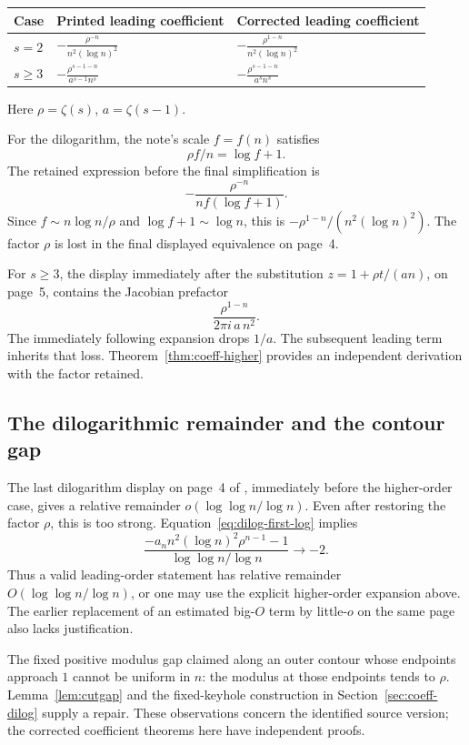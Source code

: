 \documentclass[11pt,a4paper]{article}
\numberwithin{equation}{section}
\theoremstyle{definition}
\theoremstyle{remark}
\begin{document}
\begin{center}
\begin{tabular}{@{}p{}p{}p{}@{}}
\toprule
Case & Printed leading coefficient & Corrected leading coefficient\\
\midrule
\(s=2\) &
\(\displaystyle-\frac{\rho^{-n}}{n^2(\log n)^2}\) &
\(\displaystyle-\frac{\rho^{1-n}}{n^2(\log n)^2}\)\\[12pt]
\(s\ge3\) &
\(\displaystyle-\frac{\rho^{s-1-n}}{a^{s-1}n^s}\) &
\(\displaystyle-\frac{\rho^{s-1-n}}{a^s n^s}\)\\
\bottomrule
\end{tabular}
\end{center}
Here \(\rho=\zeta(s)\), \(a=\zeta(s-1)\).

For the dilogarithm, the note's scale \(f=f(n)\) satisfies
\[
 \rho f/n=\log f+1.
\]
The retained expression before the final simplification is
\[
 -\frac{\rho^{-n}}{n f(\log f+1)}.
\]
Since \(f\sim n\log n/\rho\) and \(\log f+1\sim\log n\),
this is
\(-\rho^{1-n}/(n^2(\log n)^2)\).
The factor \(\rho\) is lost in the final displayed equivalence on
page~4.

For \(s\ge3\), the display immediately after the substitution
\(z=1+\rho t/(a n)\), on page~5, contains the
Jacobian prefactor
\[
 \frac{\rho^{1-n}}{2\pi i\,a\,n^2}.
\]
The immediately following expansion drops \(1/a\).
The subsequent leading term inherits that loss.
Theorem~\ref{thm:coeff-higher} provides an independent derivation with
the factor retained.

\subsection{The dilogarithmic remainder and the contour gap}

The last dilogarithm display on page~4 of \cite{kr}, immediately before
the higher-order case, gives a relative remainder
\(o(\log\log n/\log n)\).  Even after restoring the factor \(\rho\),
this is too strong.  Equation~\eqref{eq:dilog-first-log} implies
\[
 \frac{-a_n n^2(\log n)^2\rho^{n-1}-1}
      {\log\log n/\log n}\longrightarrow-2.
\]
Thus a valid leading-order statement has relative remainder
\(O(\log\log n/\log n)\), or one may use the explicit higher-order
expansion above.  The earlier replacement of an estimated big-\(O\)
term by little-\(o\) on the same page also lacks justification.

The fixed positive modulus gap claimed along an outer contour whose
endpoints approach \(1\) cannot be uniform in \(n\): the modulus at
those endpoints tends to \(\rho\).  Lemma~\ref{lem:cutgap} and the
fixed-keyhole construction in Section~\ref{sec:coeff-dilog} supply a
repair.  These observations concern the identified source version;
the corrected coefficient theorems here have independent proofs.
\end{document}
